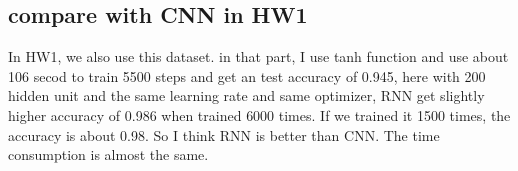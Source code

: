 \documentclass[12pt]{article}
\begin{document}
\subsection{compare with CNN in HW1}
In HW1, we also use this dataset. in that part, I use tanh function and use about 106 secod to train 5500 steps and get an test accuracy of 0.945, here with 200 hidden unit and the same learning rate and same optimizer, RNN get slightly higher accuracy of 0.986 when trained 6000 times. If we trained it 1500 times, the accuracy is about 0.98. So I think RNN is better than CNN. The time consumption is almost the same.








\begin{lstlisting}

\end{lstlisting}



			
\end{document}
